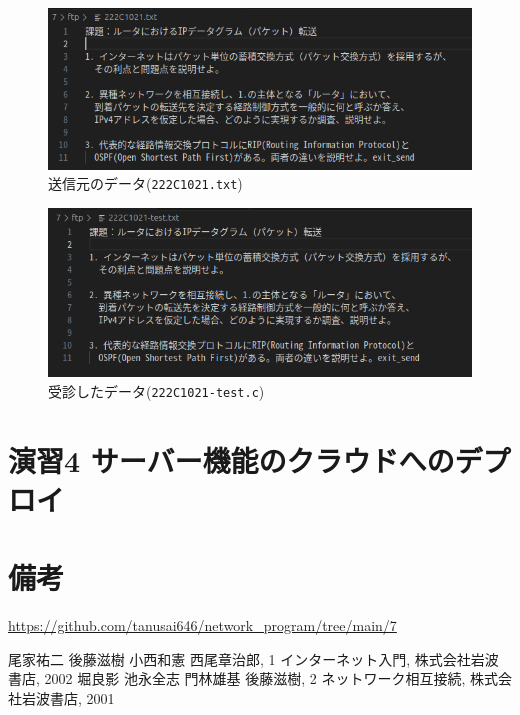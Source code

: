 \documentclass[documentclass]{jsarticle}
\begin{document}
\begin{figure}[H]
  \begin{center}
    \includegraphics*[]{figure/3-3.png}
  \end{center}
  \caption{送信元のデータ(\texttt{222C1021.txt})}
  \label{fig:3-3}
\end{figure}

\begin{figure}[H]
  \begin{center}
    \includegraphics*[]{figure/3-4.png}
  \end{center}
  \caption{受診したデータ(\texttt{222C1021-test.c})}
  \label{fig:3-4}
\end{figure}

\newpage
\section*{演習4 サーバー機能のクラウドへのデプロイ}

\newpage
\section*{備考}
\url{https://github.com/tanusai646/network_program/tree/main/7}

\begin{thebibliography}{9}
   尾家祐二 後藤滋樹 小西和憲 西尾章治郎, 1 インターネット入門, 株式会社岩波書店, 2002 
   堀良影 池永全志 門林雄基 後藤滋樹, 2 ネットワーク相互接続, 株式会社岩波書店, 2001
\end{thebibliography}
\end{document}
